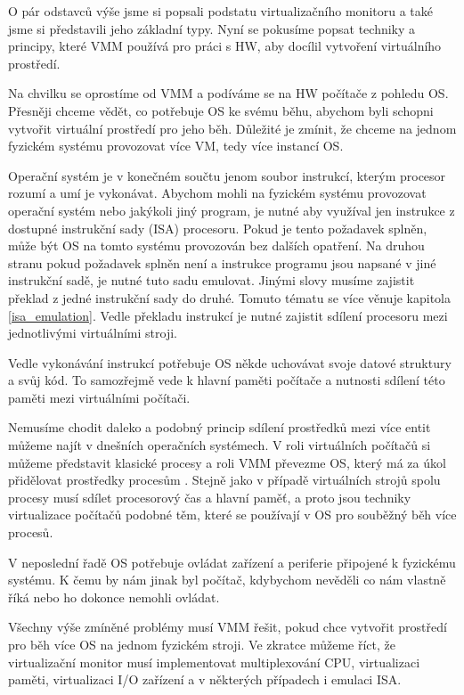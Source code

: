 O pár odstavců výše jsme si popsali podstatu virtualizačního monitoru a také jsme si představili jeho základní typy. Nyní se pokusíme popsat techniky a principy, které VMM používá pro práci s HW, aby docílil vytvoření virtuálního prostředí.  

Na chvilku se oprostíme od VMM a podíváme se na HW počítače z pohledu OS. Přesněji chceme vědět, co potřebuje OS ke svému běhu, abychom byli schopni vytvořit virtuální prostředí pro jeho běh. Důležité je zmínit, že chceme na jednom
fyzickém systému provozovat více VM, tedy více instancí OS.

Operační systém je v konečném součtu jenom soubor instrukcí, kterým procesor rozumí a umí je vykonávat. Abychom mohli na fyzickém systému provozovat operační systém nebo jakýkoli jiný program, je nutné aby využíval jen instrukce z
dostupné instrukční sady (ISA) procesoru. Pokud je tento požadavek splněn, může být OS na tomto systému provozován bez dalších opatření. Na druhou stranu pokud požadavek splněn není a instrukce programu jsou napsané v jiné instrukční sadě, 
je nutné tuto sadu emulovat. Jinými slovy musíme zajistit překlad z jedné instrukční sady do druhé. Tomuto tématu se více věnuje kapitola \ref{isa_emulation}. Vedle překladu instrukcí je nutné zajistit sdílení procesoru mezi jednotlivými
virtuálními stroji.

Vedle vykonávání instrukcí potřebuje OS někde uchovávat svoje datové struktury a svůj kód. To samozřejmě vede k hlavní paměti počítače a nutnosti sdílení této paměti mezi virtuálními počítači.

Nemusíme chodit daleko a podobný princip sdílení prostředků mezi více entit můžeme najít v dnešních operačních systémech. V roli virtuálních počítačů si můžeme představit klasické procesy a roli VMM převezme OS, který má za úkol
přidělovat prostředky procesům \cite{virt1}. Stejně jako v případě virtuálních strojů spolu procesy musí sdílet procesorový čas a hlavní paměť, a proto jsou techniky virtualizace počítačů podobné těm, které se používají v OS pro 
souběžný běh více procesů.

V neposlední řadě OS potřebuje ovládat zařízení a periferie připojené k fyzickému systému. K čemu by nám jinak byl počítač, kdybychom nevěděli co nám vlastně říká nebo ho dokonce nemohli ovládat. 

Všechny výše zmíněné problémy musí VMM řešit, pokud chce vytvořit prostředí pro běh více OS na jednom fyzickém stroji. Ve zkratce můžeme říct, že virtualizační monitor musí implementovat multiplexování CPU, virtualizaci paměti,
virtualizaci I/O zařízení a v některých případech i emulaci ISA.

